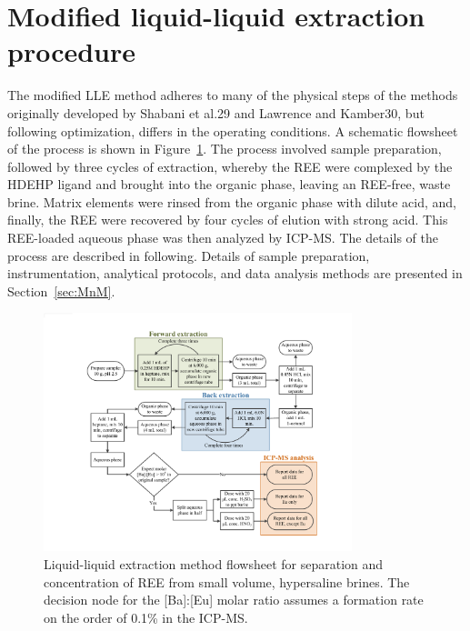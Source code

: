 \section{Modified liquid-liquid extraction procedure}

The modified LLE method adheres to many of the physical steps of the methods originally developed by Shabani et al.29 and Lawrence and Kamber30, but following optimization, differs in the operating conditions.
A schematic flowsheet of the process is shown in Figure~\ref{fig:flowsheet}.
The process involved sample preparation, followed by three cycles of extraction, whereby the REE were complexed by the HDEHP ligand and brought into the organic phase, leaving an REE-free, waste brine.
Matrix elements were rinsed from the organic phase with dilute acid, and, finally, the REE were recovered by four cycles of elution with strong acid.
This REE-loaded aqueous phase was then analyzed by ICP-MS.
The details of the process are described in following. Details of sample preparation, instrumentation, analytical protocols, and data analysis methods are presented in Section~\ref{sec:MnM}.

\begin{figure}
\begin{center}
\includegraphics[width=0.8\textwidth]{Ch4_figures/LLE-flowsheet.pdf}
\caption{Liquid-liquid extraction method flowsheet for separation and concentration of REE from small volume, hypersaline brines. The decision node for the [Ba]:[Eu] molar ratio assumes a  formation rate on the order of 0.1\% in the ICP-MS.}\label{fig:flowsheet}
\end{center}
\end{figure}


